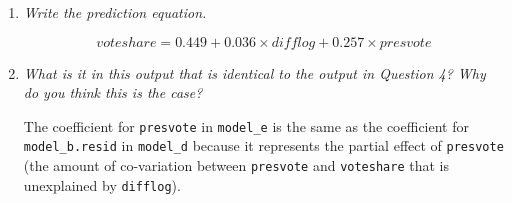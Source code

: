 \documentclass[12pt,letterpaper]{article}
\begin{document}
\begin{enumerate}
				\vspace{.25cm}
		\item \emph{Write the prediction equation.}	\vspace{.25cm}
		
		
		\begin{equation*}
		voteshare = 0.449 + 0.036 \times difflog + 0.257 \times presvote
		\end{equation*}
		
	\vspace{.25cm}
		
		\item \emph{What is it in this output that is identical to the output in Question 4? Why do you think this is the case?}	\vspace{.25cm}

		The coefficient for \texttt{presvote} in \texttt{model\_e} is the same as the coefficient for \texttt{model\_b.resid} in \texttt{model\_d} because it represents the partial effect of \texttt{presvote} (the amount of co-variation between \texttt{presvote} and \texttt{voteshare} that is unexplained by \texttt{difflog}).
	\end{enumerate}
	
	
\end{document}
